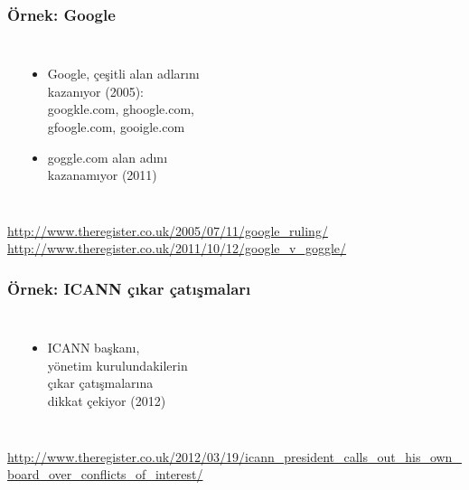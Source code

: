\documentclass[dvipsnames]{beamer}
\theoremstyle{plain}
\begin{document}
\begin{frame}
  \frametitle{Örnek: Google}

  \begin{columns}
    \begin{center}
    \end{center}

    \begin{itemize}
      \item Google, çeşitli alan adlarını\\
        kazanıyor (2005):\\
        googkle.com, ghoogle.com,\\
        gfoogle.com, gooigle.com
      \item goggle.com alan adını\\
        kazanamıyor (2011)
    \end{itemize}
  \end{columns}

  \medskip
  \tiny{\url{http://www.theregister.co.uk/2005/07/11/google_ruling/}}\\
  \tiny{\url{http://www.theregister.co.uk/2011/10/12/google_v_goggle/}}\\
\end{frame}

\begin{frame}
  \frametitle{Örnek: ICANN çıkar çatışmaları}

  \begin{columns}
    \begin{center}
    \end{center}

    \begin{itemize}
      \item ICANN başkanı,\\
        yönetim kurulundakilerin\\
        çıkar çatışmalarına\\
        dikkat çekiyor (2012)
    \end{itemize}
  \end{columns}

  \medskip
  \tiny{\url{http://www.theregister.co.uk/2012/03/19/icann_president_calls_out_his_own_board_over_conflicts_of_interest/}}\\
\end{frame}
\end{document}
